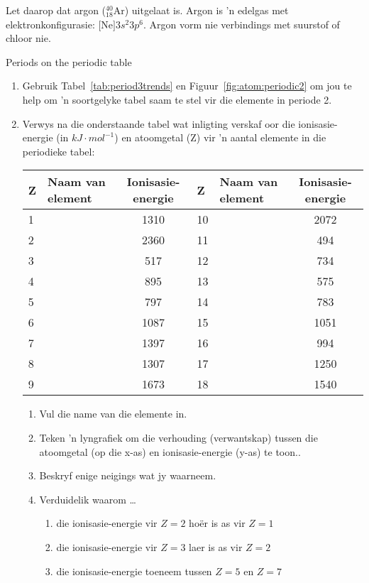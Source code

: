 Let daarop dat argon ($^{40}_{18}\text{Ar}$) uitgelaat is. Argon is 'n edelgas met elektronkonfigurasie: $\text{[Ne]}3s^{2}3p^{6}$. Argon vorm nie verbindings met suurstof of chloor nie. 
\begin{exercises}{Periods on the periodic table}
{
\begin{enumerate}[noitemsep, label=\textbf{\arabic*}. ]
\item Gebruik Tabel~\ref{tab:period3trends} en Figuur~\ref{fig:atom:periodic2} om jou te help om 'n soortgelyke tabel saam te stel vir die elemente in periode 2.
\item Verwys na die onderstaande tabel wat inligting verskaf oor die ionisasie-energie (in $kJ \cdot mol^{-1}$) en atoomgetal (Z) vir 'n aantal elemente in die periodieke tabel:\\
\begin{center}
\begin{tabular}{|l|l|c|l|l|c|}\hline
\textbf{Z} & Naam van element & Ionisasie-energie & \textbf{Z} & Naam van element & Ionisasie-energie \\\hline
1 &   & 1310 & 10 &        & 2072 \\\hline
2 &     & 2360 & 11 &      & 494  \\\hline
3 &    & 517  & 12 &   & 734  \\\hline
4 &  & 895  & 13 &   & 575  \\\hline
5 &      & 797  & 14 &     & 783  \\\hline
6 &     & 1087 & 15 &  & 1051 \\\hline
7 &   & 1397 & 16 &     & 994  \\\hline
8 &     & 1307 & 17 &    & 1250 \\\hline
9 &   & 1673 & 18 &       & 1540 \\\hline
\end{tabular}
\end{center}

\begin{enumerate}[noitemsep, label=\textbf{\alph*}. ]
 \item Vul die name van die elemente in.
\item Teken 'n lyngrafiek om die verhouding (verwantskap) tussen die atoomgetal (op die x-as) en ionisasie-energie (y-as) te toon..
\item Beskryf enige neigings wat jy waarneem.
\item Verduidelik waarom \ldots
	\begin{enumerate}[noitemsep, label=\textbf{\roman*}. ]
	\item die ionisasie-energie vir $Z=2$ ho\"{e}r is as vir $Z=1$
	\item die ionisasie-energie vir $Z=3$ laer is as vir $Z=2$
	\item die ionisasie-energie toeneem tussen $Z=5$ en $Z=7$
	\end{enumerate}


\end{enumerate}
\end{enumerate}}
\end{exercises}
